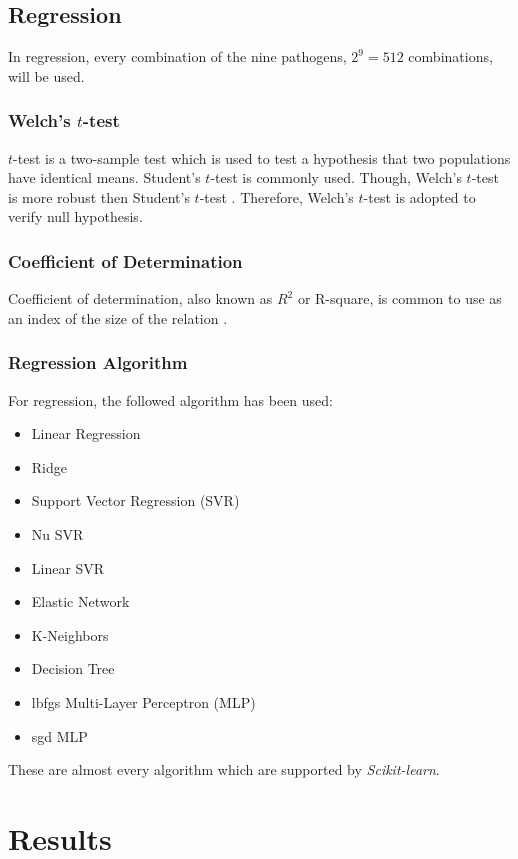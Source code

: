 \documentclass[aps, 11pt, a4paper]{article}
\begin{document}
		\subsection{Regression}
			In regression, every combination of the nine pathogens, $2^9 = 512$ combinations, will be used. 
			
			\subsubsection{Welch's $t$-test}
				$t$-test is a two-sample test which is used to test a hypothesis that two populations have identical means. Student's $t$-test is commonly used. Though, Welch's $t$-test is more robust then Student's $t$-test \cite{ref:ttest1}. Therefore, Welch's $t$-test is adopted to verify null hypothesis. 
			
			\subsubsection{Coefficient of Determination}
				Coefficient of determination, also known as $R^2$ or R-square, is common to use as an index of the size of the relation \cite{ref:rsquare1}. 
				
			\subsubsection{Regression Algorithm}
				For regression, the followed algorithm has been used:
				\begin{itemize}
					\item Linear Regression
					\item Ridge
					\item Support Vector Regression (SVR)
					\item Nu SVR
					\item Linear SVR
					\item Elastic Network
					\item K-Neighbors
					\item Decision Tree
					\item lbfgs Multi-Layer Perceptron (MLP)
					\item sgd MLP
				\end{itemize}
				These are almost every algorithm which are supported by \textit{Scikit-learn}.
    
    \section{Results}
\end{document}

